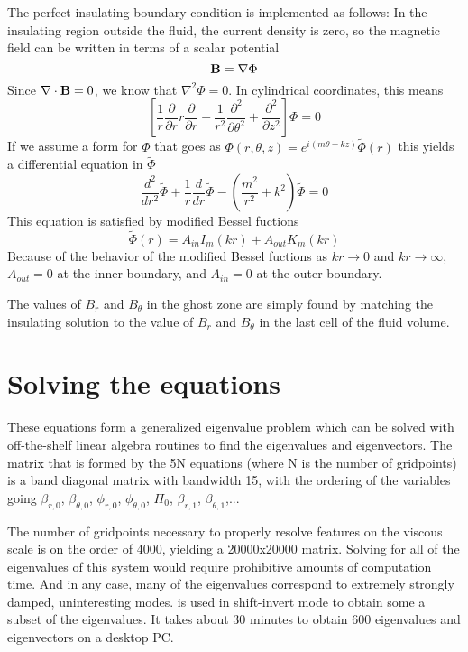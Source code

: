 \documentclass[letterpaper]{article}
\begin{document}
The perfect insulating boundary condition is implemented as follows:  In the insulating region outside the fluid, the current density is zero, so the magnetic field can be written in terms of a scalar potential
\begin{equation}
{\bf B} = {\bf \nabla}\Phi
\end{equation}
Since ${\bf \nabla}\cdot{\bf B} = 0$, we know that $\nabla^2 \Phi = 0$.  In cylindrical coordinates, this means
\begin{equation}
\left[\frac{1}{r}\frac{\partial}{\partial r}r\frac{\partial}{\partial r} + \frac{1}{r^2}\frac{\partial^2}{\partial\theta^2} +\frac{\partial^2}{\partial z^2}\right]\Phi = 0
\end{equation}
If we assume a form for $\Phi$ that goes as $\Phi(r,\theta,z) = e^{i(m\theta + k z)}\tilde{\Phi}(r)$
this yields a differential equation in $\tilde{\Phi}$
\begin{equation}
\frac{d^2}{d r^2}\tilde{\Phi} + \frac{1}{r}\frac{d}{dr}\tilde{\Phi} - \left(\frac{m^2}{r^2} + k^2\right)\tilde{\Phi} = 0
\end{equation}
This equation is satisfied by modified Bessel fuctions
\begin{equation}
\tilde{\Phi}(r) = A_{in} I_m (k r) + A_{out} K_m (k r)
\end{equation}
Because of the behavior of the modified Bessel fuctions as $k r \rightarrow 0$ and $k r \rightarrow \infty$, $A_{out} = 0$ at the inner boundary, and $A_{in} = 0$ at the outer boundary.

The values of $B_r$ and $B_\theta$ in the ghost zone are simply found by matching the insulating solution to the value of $B_r$ and $B_\theta$ in the last cell of the fluid volume.

\section{Solving the equations}

These equations form a generalized eigenvalue problem which can be solved with off-the-shelf linear algebra routines to find the eigenvalues and eigenvectors.  The matrix that is formed by the 5N equations (where N is the number of gridpoints) is a band diagonal matrix with bandwidth 15, with the ordering of the variables going $\beta_{r,0}$, $\beta_{\theta,0}$, $\phi_{r,0}$, $\phi_{\theta,0}$, $\Pi_0$, $\beta_{r,1}$, $\beta_{\theta,1}$,...

The number of gridpoints necessary to properly resolve features on the viscous scale is on the order of 4000, yielding a 20000x20000 matrix.  Solving for all of the eigenvalues of this system would require prohibitive amounts of computation time.  And in any case, many of the eigenvalues correspond to extremely strongly damped, uninteresting modes.  \verb@ARPACK@ is used in shift-invert mode to obtain some a subset of the eigenvalues.  It takes about 30 minutes to obtain 600 eigenvalues and eigenvectors on a desktop PC.
\end{document}
